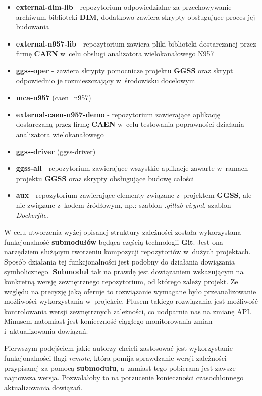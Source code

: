 \begin{itemize}
\item \color{orangei} \textbf{external-dim-lib} \color{black} - repozytorium odpowiedzialne za przechowywanie archiwum biblioteki \textbf{DIM}, dodatkowo zawiera skrypty obsługujące proces jej budowania
\item \color{orangei} \textbf{external-n957-lib} \color{black} - repozytorium zawiera pliki biblioteki dostarczanej przez firmę \textbf{CAEN} w~celu obsługi analizatora wielokanałowego N957
\item \color{orangei} \textbf{ggss-oper} \color{black} - zawiera skrypty pomocnicze projektu \textbf{GGSS} oraz skrypt odpowiednio je rozmieszczający w~środowisku docelowym
\item \textbf{mca-n957} (caen\_n957)
\item \color{orangei} \textbf{external-caen-n957-demo} \color{black} - repozytorium zawierające aplikację dostarczaną przez firmę \textbf{CAEN} w~celu testowania poprawności działania analizatora wielokanałowego
\item \textbf{ggss-driver} (ggss-driver)
\item \color{orangei} \textbf{ggss-all} \color{black} - repozytorium zawierające wszystkie aplikacje zawarte w~ramach projektu \textbf{GGSS} oraz skrypty obsługujące budowę całości
\item \color{orangei} \textbf{aux} \color{black} - repozytorium zawierające elementy związane z~projektem \textbf{GGSS}, ale nie związane z~kodem źródłowym, np.: szablon \textit{.gitlab-ci.yml}, szablon \textit{Dockerfile}.
\end{itemize}

W celu utworzenia wyżej opisanej struktury zależności została wykorzystana funkcjonalność \textbf{submodułów} będąca częścią technologii \textbf{Git}. Jest ona narzędziem służącym tworzeniu kompozycji repozytoriów w~dużych projektach. Sposób działania tej funkcjonalności jest podobny do działania dowiązania symbolicznego. \textbf{Submoduł} tak na prawdę jest dowiązaniem wskazującym na konkretną wersję zewnętrznego repozytorium, od którego zależy projekt. Ze względu na precyzję jaką oferuje to rozwiązanie wymagane było przeanalizowanie możliwości wykorzystania w~projekcie. Plusem takiego rozwiązania jest możliwość kontrolowania wersji zewnętrznych zależności, co uodparnia nas na zmianę API. Minusem natomiast jest konieczność ciągłego monitorowania zmian i~aktualizowania dowiązań.

Pierwszym podejściem jakie autorzy chcieli zastosować jest wykorzystanie funkcjonalności flagi \textit{remote}, która pomija sprawdzanie wersji zależności przypisanej za pomocą \textbf{submodułu}, a~zamiast tego pobierana jest zawsze najnowsza wersja. Pozwalałoby to na porzucenie konieczności czasochłonnego aktualizowania dowiązań. 

